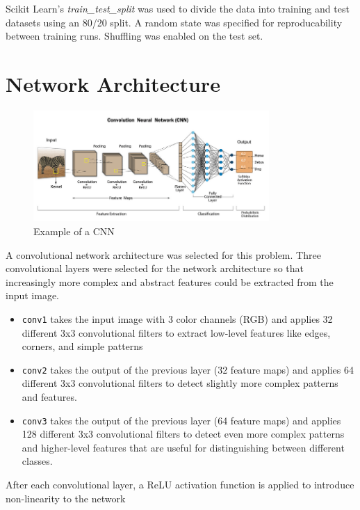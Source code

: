 \documentclass{article}
\begin{document}
Scikit Learn's \emph{train\_test\_split} was used to divide the data into training and test datasets using an 80/20 split. A random state was specified for reproducability between training runs. Shuffling was enabled on the test set.


\section{Network Architecture}

\begin{figure}
    \centering
    \includegraphics[width=0.8\textwidth]{cnn.png}
    \caption{Example of a CNN}
    \label{fig:network_architecture}
\end{figure}

A convolutional network architecture was selected for this problem. Three convolutional layers were selected for the network architecture so that increasingly more complex and 
abstract features could be extracted from the input image.

\begin{itemize}
    \item \verb|conv1|  takes the input image with 3 color channels (RGB) and applies 32 different 3x3 convolutional filters to extract low-level features like edges, corners, and simple patterns
    \item \verb|conv2| takes the output of the previous layer (32 feature maps) and applies 64 different 3x3 convolutional filters to detect slightly more complex patterns and features.
    \item \verb|conv3| takes the output of the previous layer (64 feature maps) and applies 128 different 3x3 convolutional filters to detect even more complex patterns and higher-level features that are useful for distinguishing between different classes.
\end{itemize}

After each convolutional layer, a ReLU activation function is applied to introduce non-linearity to the network
\end{document}
